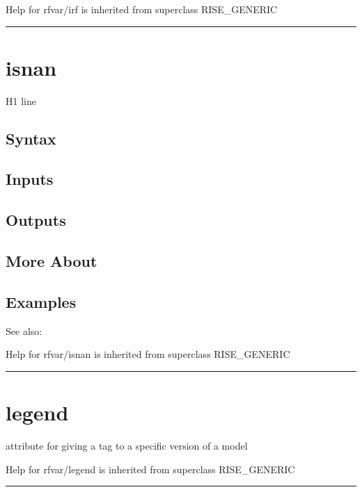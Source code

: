 \documentclass[letterpaper,10pt,english]{sphinxmanual}
\begin{document}
Help for rfvar/irf is inherited from superclass RISE\_GENERIC


\bigskip\hrule{}\bigskip



\section{isnan}
\label{classes/models/@rfvar/rfvar:isnan}\label{classes/models/@rfvar/rfvar:id49}
H1 line


\subsection{Syntax}
\label{classes/models/@rfvar/rfvar:id50}

\subsection{Inputs}
\label{classes/models/@rfvar/rfvar:id51}

\subsection{Outputs}
\label{classes/models/@rfvar/rfvar:id52}

\subsection{More About}
\label{classes/models/@rfvar/rfvar:id53}

\subsection{Examples}
\label{classes/models/@rfvar/rfvar:id54}
See also:

Help for rfvar/isnan is inherited from superclass RISE\_GENERIC


\bigskip\hrule{}\bigskip



\section{legend}
\label{classes/models/@rfvar/rfvar:id55}\label{classes/models/@rfvar/rfvar:legend}
attribute for giving a tag to a specific version of a model

Help for rfvar/legend is inherited from superclass RISE\_GENERIC


\bigskip\hrule{}\bigskip
\end{document}
